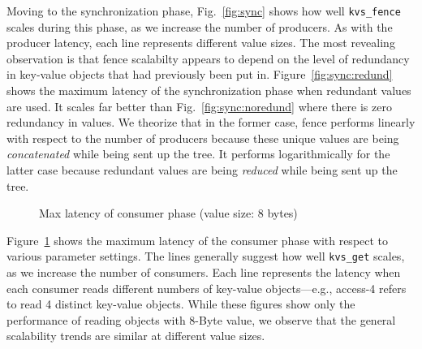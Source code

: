 Moving to the synchronization phase, Fig.~\ref{fig:sync} shows 
how well {\tt kvs\_fence} scales during this phase,
as we increase the number of producers. 
As with the producer latency,
each line represents different value sizes.  
The most revealing observation is that 
fence scalabilty appears to depend on the level of
redundancy in key-value objects that had previously 
been put in. Figure~\ref{fig:sync:redund} 
shows the maximum latency of the synchronization phase
when redundant values are used. It scales
far better than Fig.~\ref{fig:sync:noredund}
where there is zero redundancy in values. 
We theorize that in the former case, fence performs linearly with respect to the number of
producers because these unique values are being {\em concatenated} while
being sent up the tree. It performs logarithmically for the latter case
because redundant values are being {\em reduced} while being sent 
up the tree. %



\begin{figure}[ht]
\centering
\begin{subfigure}[With single-directory layout]{
  \texttt{[image: consumer-1-dir]}
  \label{fig:cons:dir}
}%
\end{subfigure}
\begin{subfigure}[Improvements with multiple directories]{
  \texttt{[image: consumer-dist-dir]}
  \label{fig:cons:dirs}
}%
\end{subfigure}
\caption{Max latency of consumer phase (value size: 8 bytes)}
\vspace{-.5cm}
\label{fig:consumer}
\end{figure}

Figure~\ref{fig:consumer} shows the maximum latency of the consumer
phase with respect to various parameter settings. 
The lines generally suggest how well {\tt kvs\_get}
scales, as we increase the number of consumers. Each line represents
the latency when each consumer reads different numbers of 
key-value objects---e.g., access-4 refers to read 4 distinct key-value 
objects. While these figures show only the performance of reading
objects with 8-Byte value, we observe that the general 
scalability trends are similar at different value sizes.

